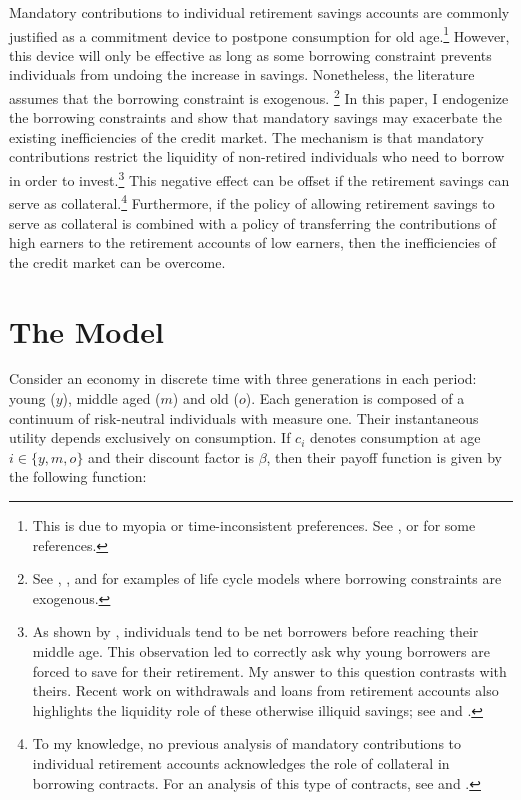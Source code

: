 \documentclass[draft,pdftex,nolinenumbers,noinfoline]{article}
\theoremstyle{plain}
\begin{document}
Mandatory contributions to individual retirement savings accounts are commonly justified as a commitment device to postpone consumption for old age.\footnote{This is due to myopia or time-inconsistent preferences. See \cite{Feldstein1985}, \cite{Laibson1998} or \cite{Diamond2003} for some references.} However, this device will only be effective as long as some borrowing constraint prevents individuals from undoing the increase in savings.
Nonetheless, the literature assumes that the borrowing constraint is exogenous.
\footnote{See \cite{Feldstein2002}, \cite{Imrohorouglu2003},  \cite{Cremer2008} and \cite{Dybvig2010} 
for examples of life cycle models where borrowing constraints are exogenous.} 
In this paper, I endogenize the borrowing constraints and show that mandatory savings may exacerbate the existing inefficiencies of the credit market. The mechanism is that mandatory contributions restrict the liquidity of non-retired individuals who need to borrow in order to invest.\footnote{As shown by \cite{Coeurdacier2015}, individuals tend to be net borrowers before reaching their middle age. This observation led \cite{Andersen2017} to correctly ask why young borrowers are forced to save for their retirement. My answer to this question contrasts with theirs. Recent work on withdrawals and loans from retirement accounts also highlights the liquidity role of these otherwise illiquid savings; see \cite{Derby2022} and \cite{Garivaltis2021}.} This negative effect can be offset if the retirement savings can serve as collateral.\footnote{To my knowledge, no previous analysis of mandatory contributions to individual retirement accounts acknowledges the role of collateral in borrowing contracts. For an analysis of this type of contracts, see \cite{Geanakoplos2010} and \cite{Simsek2013b}.} Furthermore, if the policy of allowing retirement savings to serve as collateral is combined with a policy of transferring the contributions of high earners to the retirement accounts of low earners, then the inefficiencies of the credit market can be overcome.

\section{The Model}\label{sec:model}

Consider an economy in discrete time with three generations in each period: young ($y$), middle aged ($m$) and old ($o$). Each generation is composed of a continuum of risk-neutral individuals with measure one. Their instantaneous utility depends exclusively on consumption. If $c_i$ denotes consumption at age $i\in\{y,m,o\}$ and their discount factor is $\beta$, then their payoff function is given by the following function:
\end{document}
